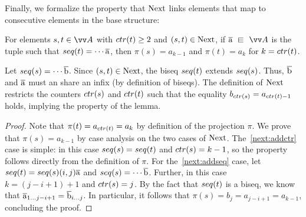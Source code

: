 Finally, we formalize the property that $\mathrm{Next}$ links elements that map to consecutive elements in the base structure:
\begin{lemma}\label{lem:projection-next}
For elements $s, t \in \unraveldom{A}$ with $\ctr{t} \ge 2$ and $(s,t) \in \mathrm{Next}$, if $\elemtuplea \sqin \unraveldom{A}$ is the tuple such that $\seq{t} = \cdots \elemtuplea$, then $\pi(s) = a_{k-1}$ and $\pi(t) = a_{k}$ for $k = \ctr{t}$.
\end{lemma}
\begin{proofsketch}
  Let $\seq{s} = \cdots \elemtupleb$.
  Since $(s,t) \in \mathrm{Next}$, the biseq $\seq{t}$ extends $\seq{s}$.
  Thus, $\overline{\mathrm{b}}$ and $\overline{\mathrm{a}}$ must an share an infix (by definition of biseqs).
  The definition of $\mathrm{Next}$ restricts the counters $\ctr{s}$ and $\ctr{t}$ such that the equality $b_{\ctr{s}} = a_{\ctr{t}-1}$ holds, implying the property of the lemma.
\end{proofsketch}
\begin{proof}
  Note that $\pi(t) = a_{\ctr{t}} = a_{k}$ by definition of the projection $\pi$.
  We prove that $\pi(s) = a_{k-1}$ by case analysis on the two cases of $\mathrm{Next}$.
  The~\ref{next:addctr} case is simple: in this case $\seq{s} = \seq{t}$ and $\ctr{s} = k - 1$, so the property follows directly from the definition of $\pi$.
  For the~\ref{next:addseq} case, let $\seq{t} = \seq{s} (i,j) \elemtuplea$ and $\seq{s} = \cdots \elemtupleb$.
  Further, in this case $k = (j - i + 1) + 1$ and $\ctr{s} = j$.
  By the fact that $\seq{t}$ is a biseq, we know that $\overline{\mathrm{a}}_{1\ldots j-i+1} = \overline{\mathrm{b}}_{i\ldots j}$.
  In particular, it follows that $\pi(s) = b_{j} = a_{j-i+1} = a_{k-1}$, concluding the proof.
\end{proof}

